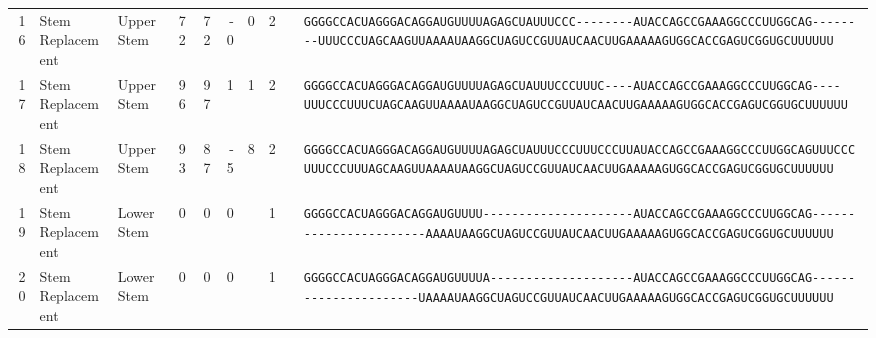 \begin{tabular}{rllrrrrrcl}
 16 & Stem Replacement & Upper Stem & 72 & 72 & -0 & 0 & 2 &  &
 \color{ucsfdarkgrey}\verb|GGGGCCACUAGGGACAGGAU|\color{ucsforange}\verb|GUUUUA|\color{ucsfblue}\verb|GAGCUAUUUCCC--------|\color{ucsfpurple}\verb|AUACCAGCCGAAAGGCCCUUGGCAG|\color{ucsfblue}\verb|--------UUUCCCUAGCAAGU|\color{ucsforange}\verb|UAAAAUAA|\color{ucsfnavy}\verb|GGCUAGUCC|\color{ucsforange}\verb|GUUAUCA|\color{ucsfteal}\verb|ACUUGAAAAAGU|\color{ucsforange}\verb|GGCACCGAGUCGGUGCUUUUUU| \\

 17 & Stem Replacement & Upper Stem & 96 & 97 & 1 & 1 & 2 &  &
 \color{ucsfdarkgrey}\verb|GGGGCCACUAGGGACAGGAU|\color{ucsforange}\verb|GUUUUA|\color{ucsfblue}\verb|GAGCUAUUUCCCUUUC----|\color{ucsfpurple}\verb|AUACCAGCCGAAAGGCCCUUGGCAG|\color{ucsfblue}\verb|----UUUCCCUUUCUAGCAAGU|\color{ucsforange}\verb|UAAAAUAA|\color{ucsfnavy}\verb|GGCUAGUCC|\color{ucsforange}\verb|GUUAUCA|\color{ucsfteal}\verb|ACUUGAAAAAGU|\color{ucsforange}\verb|GGCACCGAGUCGGUGCUUUUUU| \\

 18 & Stem Replacement & Upper Stem & 93 & 87 & -5 & 8 & 2 &  &
 \color{ucsfdarkgrey}\verb|GGGGCCACUAGGGACAGGAU|\color{ucsforange}\verb|GUUUUA|\color{ucsfblue}\verb|GAGCUAUUUCCCUUUCCCUU|\color{ucsfpurple}\verb|AUACCAGCCGAAAGGCCCUUGGCAG|\color{ucsfblue}\verb|UUUCCCUUUCCCUUUAGCAAGU|\color{ucsforange}\verb|UAAAAUAA|\color{ucsfnavy}\verb|GGCUAGUCC|\color{ucsforange}\verb|GUUAUCA|\color{ucsfteal}\verb|ACUUGAAAAAGU|\color{ucsforange}\verb|GGCACCGAGUCGGUGCUUUUUU| \\

 19 & Stem Replacement & Lower Stem & 0 & 0 & 0 &  & 1 &  &
 \color{ucsfdarkgrey}\verb|GGGGCCACUAGGGACAGGAU|\color{ucsforange}\verb|GUUUU-|\color{ucsfblue}\verb|--------------------|\color{ucsfpurple}\verb|AUACCAGCCGAAAGGCCCUUGGCAG|\color{ucsfblue}\verb|----------------------|\color{ucsforange}\verb|-AAAAUAA|\color{ucsfnavy}\verb|GGCUAGUCC|\color{ucsforange}\verb|GUUAUCA|\color{ucsfteal}\verb|ACUUGAAAAAGU|\color{ucsforange}\verb|GGCACCGAGUCGGUGCUUUUUU| \\

 20 & Stem Replacement & Lower Stem & 0 & 0 & 0 &  & 1 &  &
 \color{ucsfdarkgrey}\verb|GGGGCCACUAGGGACAGGAU|\color{ucsforange}\verb|GUUUUA|\color{ucsfblue}\verb|--------------------|\color{ucsfpurple}\verb|AUACCAGCCGAAAGGCCCUUGGCAG|\color{ucsfblue}\verb|----------------------|\color{ucsforange}\verb|UAAAAUAA|\color{ucsfnavy}\verb|GGCUAGUCC|\color{ucsforange}\verb|GUUAUCA|\color{ucsfteal}\verb|ACUUGAAAAAGU|\color{ucsforange}\verb|GGCACCGAGUCGGUGCUUUUUU| \\


\end{tabular}
